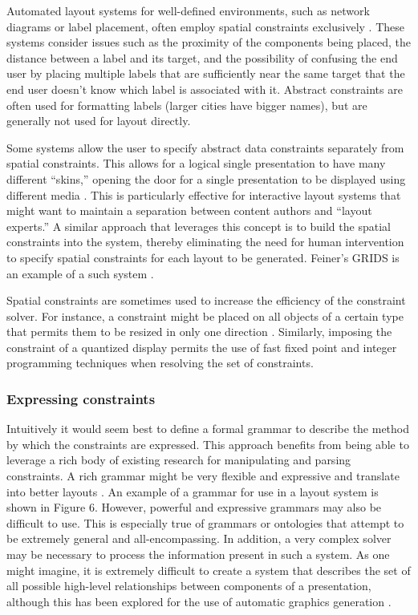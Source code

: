       Automated layout systems for well-defined environments, such as network
      diagrams or label placement, often employ spatial constraints exclusively
      \citep{kosak-1,christensen-1}. These systems consider issues such as the
      proximity of the components being placed, the distance between a label and
      its target, and the possibility of confusing the end user by placing
      multiple labels that are sufficiently near the same target that the end
      user doesn’t know which label is associated with it. Abstract constraints
      are often used for formatting labels (larger cities have bigger names), but
      are generally not used for layout directly.

      Some systems allow the user to specify abstract data constraints separately
      from spatial constraints. This allows for a logical single presentation to
      have many different “skins,” opening the door for a single presentation to
      be displayed using different media \citep{weitzman-2}. This is particularly
      effective for interactive layout systems that might want to maintain a
      separation between content authors and “layout experts.” A similar approach
      that leverages this concept is to build the spatial constraints into the
      system, thereby eliminating the need for human intervention to specify
      spatial constraints for each layout to be generated. Feiner’s GRIDS is an
      example of a such system \citep{feiner-1}.

      Spatial constraints are sometimes used to increase the efficiency of the
      constraint solver. For instance, a constraint might be placed on all
      objects of a certain type that permits them to be resized in only one
      direction \citep{linton-1}. Similarly, imposing the constraint of a
      quantized display permits the use of fast fixed point and integer
      programming techniques when resolving the set of constraints.

    \subsubsection{Expressing constraints}

     Intuitively it would seem best to define a formal grammar to describe the
     method by which the constraints are expressed. This approach benefits from
     being able to leverage a rich body of existing research for manipulating
     and parsing constraints. A rich grammar might be very flexible and
     expressive and translate into better layouts \citep{weitzman-1}. An example
     of a grammar for use in a layout system is shown in Figure 6. However,
     powerful and expressive grammars may also be difficult to use. This is
     especially true of grammars or ontologies that attempt to be extremely
     general and all-encompassing. In addition, a very complex solver may be
     necessary to process the information present in such a system. As one might
     imagine, it is extremely difficult to create a system that describes the
     set of all possible high-level relationships between components of a
     presentation, although this has been explored for the use of automatic
     graphics generation \citep{zhou-1}.

